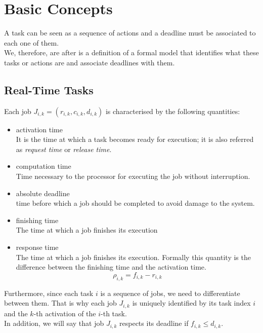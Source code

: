 \chapter{Basic Concepts}

A task can be seen as a sequence of actions and a deadline must be associated to each one of them.\\
We, therefore, are after is a definition of a formal model that identifies what these tasks or actions are and associate deadlines with them.

\section{Real-Time Tasks}

Each job $J_{i,k} =  (r_{i,k}, c_{i,k}, d_{i,k})$ is characterised by the following quantities:
\begin{itemize}
    \item{activation time}\\
    It is the time at which a task becomes ready for execution; it is also referred as \textit{request time} or \textit{release time}. 
    \item{computation time}\\
    Time necessary to the processor for executing the job without interruption.
    \item{absolute deadline}\\
    time before which a job should be completed to avoid damage to the system.
    \item{finishing time}\\
    The time at which a job finishes its execution
    \item{response time}\\
    The time at which a job finishes its execution. Formally this quantity is the difference between the finishing time and the activation time.
    \[\rho_{i,k}  = f_{i,k} - r_{i,k}\]
\end{itemize}
Furthermore, since each task $i$ is a sequence of jobs, we need to differentiate between them. That is why each job $J_{i,k}$ is uniquely identified by its task index $i$ and the $k$-th activation of the $i$-th task.\\
In addition, we will say that job $J_{i,k}$ respects its deadline if $f_{i,k} \le d_{i,k}$.



